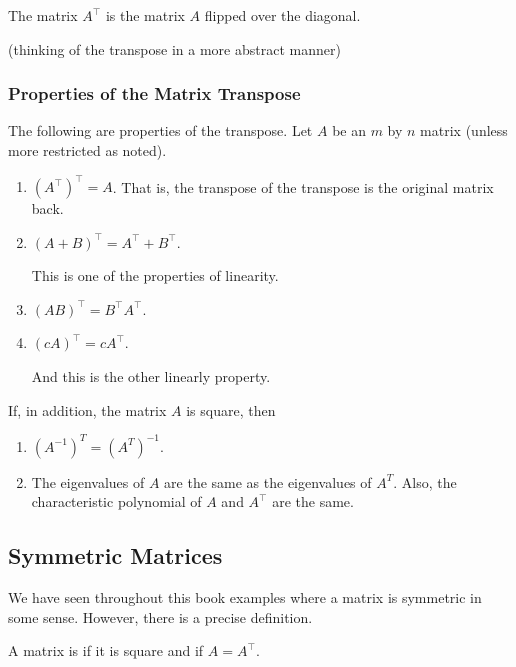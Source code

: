 The matrix $A^{\intercal}$ is the matrix $A$ flipped over the diagonal.  

(thinking of the transpose in a more abstract manner)

\subsubsection{Properties of the Matrix Transpose}

The following are properties of the transpose.   Let $A$ be an $m$ by $n$ matrix (unless more restricted as noted). 

\begin{enumerate}
\item $(A^{\intercal})^{\intercal} = A$.  That is, the transpose of the transpose is the original matrix back. 
\item $(A+B)^{\intercal} = A^{\intercal} + B^{\intercal}$. 

This is one of the properties of linearity.   
\item $(AB)^{\intercal} = B^{\intercal} A^{\intercal}$. 
\item $(cA)^{\intercal} = c A^{\intercal}$. 

And this is the other linearly property. 
\end{enumerate}
If, in addition, the matrix $A$ is square, then 
\begin{enumerate}[start=5]
\item $(A^{-1})^T=(A^T)^{-1}$.  
\item The eigenvalues of $A$ are the same as the eigenvalues of $A^T$.  Also, the characteristic polynomial of $A$ and $A^{\intercal}$ are the same.  
\end{enumerate}

\subsection{Symmetric Matrices}

We have seen throughout this book examples where a matrix is symmetric in some sense.  However, there is a precise definition. 

\begin{definition}
A matrix is  if it is square and if $A= A^{\intercal}$. 
\end{definition}

